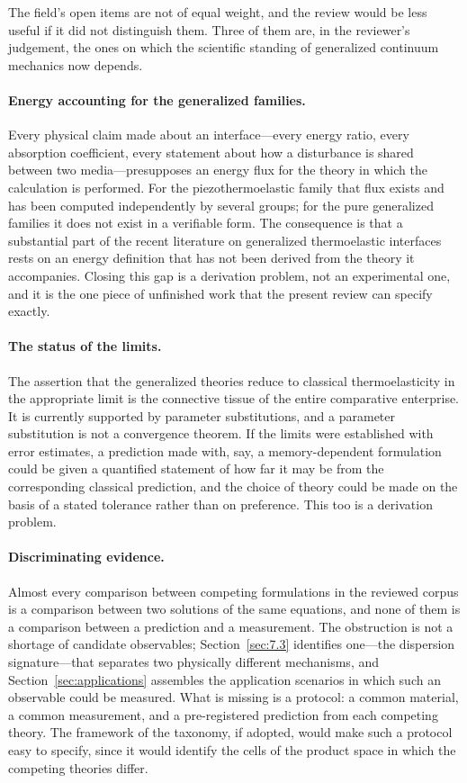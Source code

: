 The field's open items are not of equal weight, and the review would be less useful if it did not distinguish them. Three of them are, in the reviewer's judgement, the ones on which the scientific standing of generalized continuum mechanics now depends.

\paragraph{Energy accounting for the generalized families.}
Every physical claim made about an interface---every energy ratio, every absorption coefficient, every statement about how a disturbance is shared between two media---presupposes an energy flux for the theory in which the calculation is performed. For the piezothermoelastic family that flux exists and has been computed independently by several groups; for the pure generalized families it does not exist in a verifiable form. The consequence is that a substantial part of the recent literature on generalized thermoelastic interfaces rests on an energy definition that has not been derived from the theory it accompanies. Closing this gap is a derivation problem, not an experimental one, and it is the one piece of unfinished work that the present review can specify exactly.

\paragraph{The status of the limits.}
The assertion that the generalized theories reduce to classical thermoelasticity in the appropriate limit is the connective tissue of the entire comparative enterprise. It is currently supported by parameter substitutions, and a parameter substitution is not a convergence theorem. If the limits were established with error estimates, a prediction made with, say, a memory-dependent formulation could be given a quantified statement of how far it may be from the corresponding classical prediction, and the choice of theory could be made on the basis of a stated tolerance rather than on preference. This too is a derivation problem.

\paragraph{Discriminating evidence.}
Almost every comparison between competing formulations in the reviewed corpus is a comparison between two solutions of the same equations, and none of them is a comparison between a prediction and a measurement. The obstruction is not a shortage of candidate observables; Section~\ref{sec:7.3} identifies one---the dispersion signature---that separates two physically different mechanisms, and Section~\ref{sec:applications} assembles the application scenarios in which such an observable could be measured. What is missing is a protocol: a common material, a common measurement, and a pre-registered prediction from each competing theory. The framework of the taxonomy, if adopted, would make such a protocol easy to specify, since it would identify the cells of the product space in which the competing theories differ.

